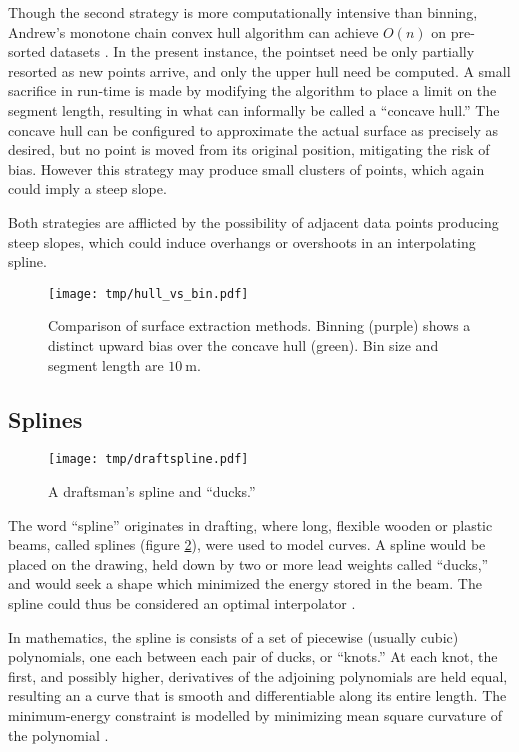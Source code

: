 \documentclass[doc]{apa6}
\begin{document}
Though the second strategy is more computationally intensive than binning, Andrew's monotone chain convex hull algorithm can achieve $O(n)$ on pre-sorted datasets \parencite{Andrew1979}. In the present instance, the pointset need be only partially resorted as new points arrive, and only the upper hull need be computed. A small sacrifice in run-time is made by modifying the algorithm to place a limit on the segment length, resulting in what can informally be called a ``concave hull.'' The concave hull can be configured to approximate the actual surface as precisely as desired, but no point is moved from its original position, mitigating the risk of bias. However this strategy may produce small clusters of points, which again could imply a steep slope.

Both strategies are afflicted by the possibility of adjacent data points producing steep slopes, which could induce overhangs or overshoots in an interpolating spline.

\begin{figure} %
\texttt{[image: tmp/hull\_vs\_bin.pdf]} 
\caption{Comparison of surface extraction methods. Binning (purple) shows a distinct upward bias over the concave hull (green). Bin size and segment length are $\SI{10}\m$.}
\label{fig:hull_vs_bin}
\end{figure}


\subsection{Splines}

\begin{figure} %
\texttt{[image: tmp/draftspline.pdf]} 
\caption{A draftsman's spline and ``ducks.'' \parencite{DeBoor2006}}
\label{fig:spline}
\end{figure}

The word ``spline'' originates in drafting, where long, flexible wooden or plastic beams, called splines (figure \ref{fig:spline}), were used to model curves. A spline would be placed on the drawing, held down by two or more lead weights called ``ducks,'' and would seek a shape which minimized the energy stored in the beam. The spline could thus be considered an optimal interpolator \parencite{Wegman2016}. 

In mathematics, the spline is consists of a set of piecewise (usually cubic) polynomials, one each between each pair of ducks, or ``knots.'' At each knot, the first, and possibly higher, derivatives of the adjoining polynomials are held equal, resulting an a curve that is smooth and differentiable along its entire length. The minimum-energy constraint is modelled by minimizing mean square curvature of the polynomial \parencite{Wegman2016}.
\end{document}
